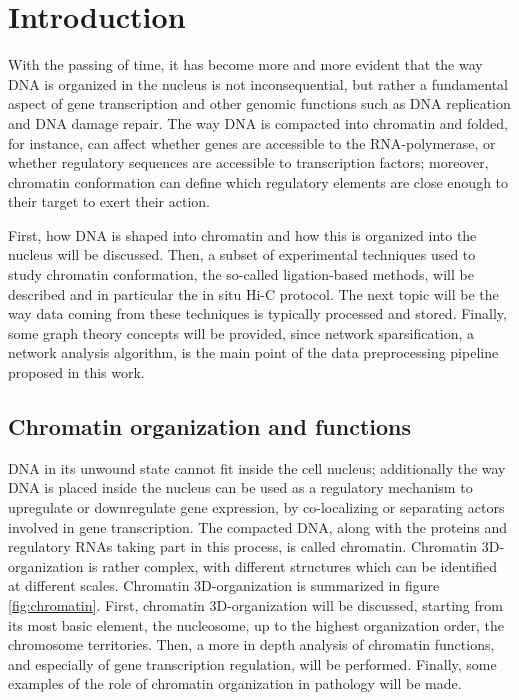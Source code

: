 \graphicspath{{chapters/02_introduction/images}}
\chapter{Introduction}


With the passing of time, it has become more and more evident that the way DNA is organized in the nucleus is not inconsequential, but rather a fundamental aspect of gene transcription and other genomic functions such as DNA replication and DNA damage repair. The way DNA is compacted into chromatin and folded, for instance, can affect whether genes are accessible to the RNA-polymerase, or whether regulatory sequences are accessible to transcription factors; moreover, chromatin conformation can define which regulatory elements are close enough to their target to exert their action\cite{chromatinfiber2015,chromatinorganization2019}.

First, how DNA is shaped into chromatin and how this is organized into the nucleus will be discussed. Then, a subset of experimental techniques used to study chromatin conformation, the so-called ligation-based methods, will be described and in particular the in situ Hi-C protocol. The next topic will be the way data coming from these techniques is typically processed and stored. Finally, some graph theory concepts will be provided, since network sparsification, a network analysis algorithm, is the main point of the data preprocessing pipeline proposed in this work.

\section{Chromatin organization and functions}

DNA in its unwound state cannot fit inside the cell nucleus; additionally the way DNA is placed inside the nucleus can be used as a regulatory mechanism to upregulate or downregulate gene expression, by co-localizing or separating actors involved in gene transcription. The compacted DNA, along with the proteins and regulatory RNAs taking part in this process, is called chromatin. Chromatin 3D-organization is rather complex, with different structures which can be identified at different scales\cite{chromatinorganization2019, chromatindevelopment2019}. Chromatin 3D-organization is summarized in figure \ref{fig:chromatin}. First, chromatin 3D-organization will be discussed, starting from its most basic element, the nucleosome, up to the highest organization order, the chromosome territories. Then, a more in depth analysis of chromatin functions, and especially of gene transcription regulation, will be performed. Finally, some examples of the role of chromatin organization in pathology will be made.

